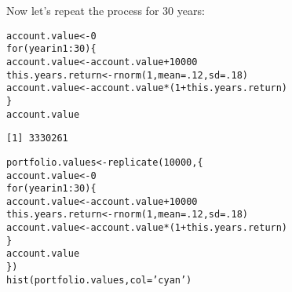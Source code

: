 \documentclass{beamer}\usepackage[]{graphicx}\usepackage[]{color}
\makeatletter
\newcommand{\hlnum}[1]{\textcolor[rgb]{0.824,0.412,0.118}{#1}}%
\newcommand{\hlstr}[1]{\textcolor[rgb]{1,0.894,0.71}{#1}}%
\newcommand{\hlopt}[1]{\textcolor[rgb]{1,0.894,0.769}{#1}}%
\newcommand{\hlstd}[1]{\textcolor[rgb]{1,0.894,0.769}{#1}}%
\newcommand{\hlkwa}[1]{\textcolor[rgb]{0.941,0.902,0.549}{#1}}%
\newcommand{\hlkwb}[1]{\textcolor[rgb]{0.804,0.776,0.451}{#1}}%
\newcommand{\hlkwc}[1]{\textcolor[rgb]{0.78,0.941,0.545}{#1}}%
\newcommand{\hlkwd}[1]{\textcolor[rgb]{1,0.78,0.769}{#1}}%
\newenvironment{kframe}{%
 \def\at@end@of@kframe{}%
 \ifinner\ifhmode%
  \def\at@end@of@kframe{\end{minipage}}%
  \begin{minipage}{\columnwidth}%
 \fi\fi%
 \def\FrameCommand##1{\hskip\@totalleftmargin \hskip-\fboxsep
 \colorbox{shadecolor}{##1}\hskip-\fboxsep
     \hskip-\linewidth \hskip-\@totalleftmargin \hskip\columnwidth}%
 \MakeFramed {\advance\hsize-\width
   \@totalleftmargin\z@ \linewidth\hsize
   \@setminipage}}%
 {\par\unskip\endMakeFramed%
 \at@end@of@kframe}
\newenvironment{knitrout}{}{} %
\makeatother
\begin{document}
\begin{darkframes}
    \begin{frame}[fragile]
      Now let's repeat the process for 30 years:
      \fontsize{10}{10}\selectfont
\begin{knitrout}
\begin{kframe}
\begin{alltt}
\hlstd{account.value} \hlkwb{<-} \hlnum{0}
\hlkwa{for} \hlstd{(year} \hlkwa{in} \hlnum{1}\hlopt{:}\hlnum{30}\hlstd{) \{}
  \hlstd{account.value} \hlkwb{<-} \hlstd{account.value} \hlopt{+} \hlnum{10000}
  \hlstd{this.years.return} \hlkwb{<-} \hlkwd{rnorm}\hlstd{(}\hlnum{1}\hlstd{,} \hlkwc{mean}\hlstd{=}\hlnum{.12}\hlstd{,} \hlkwc{sd}\hlstd{=}\hlnum{.18}\hlstd{)}
  \hlstd{account.value} \hlkwb{<-} \hlstd{account.value} \hlopt{*} \hlstd{(}\hlnum{1} \hlopt{+} \hlstd{this.years.return)}
\hlstd{\}}
\hlstd{account.value}
\end{alltt}
\begin{verbatim}
[1] 3330261
\end{verbatim}
\end{kframe}
\end{knitrout}
    \end{frame}

    \begin{frame}[fragile]
      \fontsize{9}{9}\selectfont
\begin{knitrout}
\begin{kframe}
\begin{alltt}
\hlstd{portfolio.values} \hlkwb{<-} \hlkwd{replicate}\hlstd{(}\hlnum{10000}\hlstd{, \{}
  \hlstd{account.value} \hlkwb{<-} \hlnum{0}
  \hlkwa{for} \hlstd{(year} \hlkwa{in} \hlnum{1}\hlopt{:}\hlnum{30}\hlstd{) \{}
    \hlstd{account.value} \hlkwb{<-} \hlstd{account.value} \hlopt{+} \hlnum{10000}
    \hlstd{this.years.return} \hlkwb{<-} \hlkwd{rnorm}\hlstd{(}\hlnum{1}\hlstd{,} \hlkwc{mean}\hlstd{=}\hlnum{.12}\hlstd{,} \hlkwc{sd}\hlstd{=}\hlnum{.18}\hlstd{)}
    \hlstd{account.value} \hlkwb{<-} \hlstd{account.value} \hlopt{*} \hlstd{(}\hlnum{1} \hlopt{+} \hlstd{this.years.return)}
  \hlstd{\}}
  \hlstd{account.value}
\hlstd{\})}
\hlkwd{hist}\hlstd{(portfolio.values,} \hlkwc{col}\hlstd{=}\hlstr{'cyan'}\hlstd{)}
\end{alltt}
\end{kframe}


\end{knitrout}
      \lc
    \end{frame}


\end{darkframes}
\end{document}
